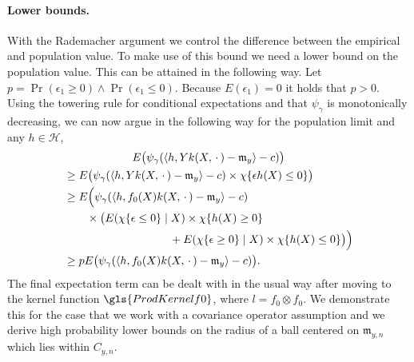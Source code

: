 \documentclass[AHL,Unicode,longabstracts,published]{cedram}
\theoremstyle{remark}
\newcommand{\cH}{\mathcal{H}}
\newcommand{\mean}{\mathfrak{m}}
\begin{document}
\paragraph{Lower bounds.} With the Rademacher argument we control the difference between the empirical and population value. To make use of this bound we need a lower bound on the population value. This can be attained in the following way. Let $p = \Pr(\epsilon_1 \geq 0) \wedge \Pr(\epsilon_1 \leq 0)$. Because $E(\epsilon_1) = 0$ it holds that $p >0$. Using the towering rule for conditional expectations and that $\psi_\gamma$ is monotonically decreasing, we can now argue in the following way for the population limit and any $h\in \cH$,
\begin{multline}\label{eq:lower_bnd_with_p}
E\bigl(\psi_\gamma(\langle h, Y k(X,\,\cdot\,) - \mean_y \rangle - c)\bigr)  \\
\begin{aligned}
&\geq E\bigl(\psi_\gamma(\langle h, Y k(X,\,\cdot\,) - \mean_y \rangle - c) \times \chi\{\epsilon h(X) \leq 0 \}\bigr)  \\
&\geq E\Bigl(\psi_\gamma(\langle h, f_0(X) k(X,\,\cdot\,) - \mean_y \rangle - c) \\
&%
\qquad
 \times\bigl(E(\chi\{\epsilon \leq 0 \}\mid X)
\times \chi\{h(X) \geq 0\}\\
&\mkern170mu 
+ E(\chi\{ \epsilon \geq 0 \}\mid X) \times \chi\{h(X) \leq 0\}\bigr)\Bigr)  \\
&\geq p E\bigl(\psi_\gamma(\langle h, f_0(X) k(X,\,\cdot\,) - \mean_y \rangle - c)\bigr).
\end{aligned}
\end{multline}
The final expectation term can be dealt with in the usual way after moving to the kernel function $\gls{ProdKernelf0}$, where $l = f_0 \otimes f_0$. We demonstrate this for the case that we work with a covariance operator assumption and we derive high probability lower bounds on the radius of a ball centered on $\mean_{y,n}$ which lies within $C_{y,n}$.
\end{document}
